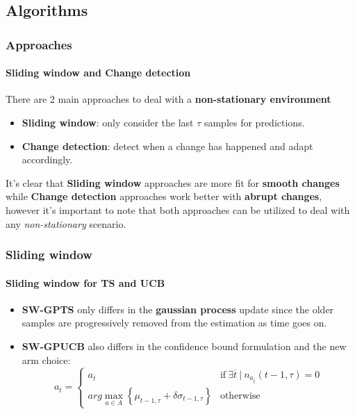 
\subsection{Algorithms}


\begin{frame}
\frametitle{Approaches}
\framesubtitle{Sliding window and Change detection}

There are 2 main approaches to deal with a \textbf{non-stationary environment}
\begin{itemize}[label={$\circ$}]
    \item \textbf{Sliding window}: only consider the last $\tau$ samples for predictions.
    \item \textbf{Change detection}: detect when a change has happened and adapt accordingly.
\end{itemize}

It's clear that \textbf{Sliding window} approaches are more fit for \textbf{smooth changes} while \textbf{Change detection} approaches work better with \textbf{abrupt changes}, however it's important to note that both approaches can be utilized to deal with any \textit{non-stationary} scenario.

\end{frame}


\begin{frame}
\frametitle{Sliding window}
\framesubtitle{Sliding window for TS and UCB}

\begin{itemize}[leftmargin=*, label={$\circ$}]
    \item \textbf{SW-GPTS} only differs in the \textbf{gaussian process} update since the older samples are progressively removed from the estimation as time goes on.
    \item \textbf{SW-GPUCB} also differs in the confidence bound formulation and the new arm choice:
        \begin{displaymath}
            a_t =
            \begin{cases}
                a_{\overline{t}} & \text{if} ~ \exists \overline{t} ~ | ~ n_{a_{\overline{t}}}(t-1, \tau) = 0 \\
                arg\max_{a \in A} \left\{ \mu_{t-1, \tau} + \delta \sigma_{t-1, \tau} \right\} & \text{otherwise}
            \end{cases}
        \end{displaymath}
\end{itemize}

\end{frame}

